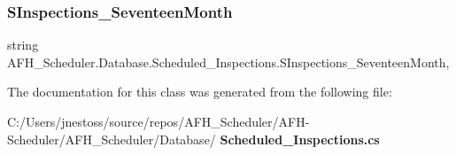 \subsubsection{SInspections\_SeventeenMonth}
{\footnotesize\ttfamily string A\+F\+H\+\_\+\+Scheduler.\+Database.\+Scheduled\+\_\+\+Inspections.\+S\+Inspections\+\_\+\+Seventeen\+Month\hspace{0.3cm}{\ttfamily [get]}, {\ttfamily [set]}}



The documentation for this class was generated from the following file\+:\begin{DoxyCompactItemize}
\item 
C\+:/\+Users/jnestoss/source/repos/\+A\+F\+H\+\_\+\+Scheduler/\+A\+F\+H-\/\+Scheduler/\+A\+F\+H\+\_\+\+Scheduler/\+Database/\textbf{ Scheduled\+\_\+\+Inspections.\+cs}\end{DoxyCompactItemize}
